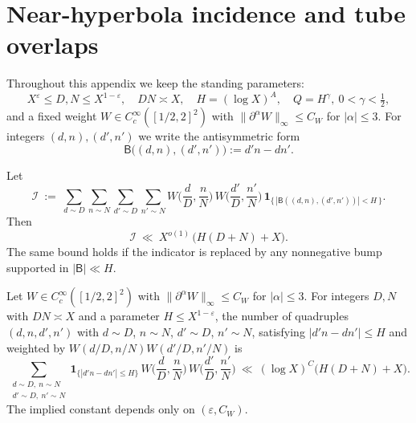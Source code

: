 
\section{Near-hyperbola incidence and tube overlaps}\label{app:incidence}

Throughout this appendix we keep the standing parameters:
\[
X^\varepsilon\le D,N\le X^{1-\varepsilon},\quad DN\asymp X,\quad
H=(\log X)^A,\quad Q=H^\gamma,\ 0<\gamma<\tfrac12,
\]
and a fixed weight $W\in C_c^\infty([1/2,2]^2)$ with $\|\partial^\alpha W\|_\infty\le C_W$ for $|\alpha|\le 3$.
For integers $(d,n),(d',n')$ we write the antisymmetric form
\[
\mathsf B\bigl((d,n),(d',n')\bigr):=d'n-dn'.
\]

\begin{proposition}\label{prop:incidence-weighted}
Let
\[
\mathcal I\ :=\ \sum_{d\sim D}\sum_{n\sim N}\sum_{d'\sim D}\sum_{n'\sim N}
W\!\Big(\frac{d}{D},\frac{n}{N}\Big)\,W\!\Big(\frac{d'}{D},\frac{n'}{N}\Big)\,
\mathbf 1_{\{\,|\mathsf B((d,n),(d',n'))|<H\,\}}.
\]
Then
\begin{equation}\label{eq:incidence}
\mathcal I\ \ll\ X^{o(1)}\,\Big(H(D+N)+X\Big).
\end{equation}
The same bound holds if the indicator is replaced by any nonnegative bump supported in $|\mathsf B|\ll H$.
\end{proposition}

\begin{proposition}\label{prop:incidence}
Let $W\in C_c^\infty([1/2,2]^2)$ with $\|\partial^\alpha W\|_\infty\le C_W$ for $|\alpha|\le 3$. For integers $D,N$ with $DN\asymp X$ and a parameter $H\le X^{1-\varepsilon}$, the number of quadruples $(d,n,d',n')$ with $d\sim D$, $n\sim N$, $d'\sim D$, $n'\sim N$, satisfying $|d'n-dn'|\le H$ and weighted by $W(d/D,n/N)W(d'/D,n'/N)$ is
\[
\sum_{\substack{d\sim D,\ n\sim N\\ d'\sim D,\ n'\sim N}}\!
\mathbf 1_{\{|d'n-dn'|\le H\}}\,
W\!\Big(\frac dD,\frac nN\Big)\,W\!\Big(\frac{d'}D,\frac{n'}N\Big)
\ \ll\ (\log X)^C\big(H(D+N)+X\big).
\]
The implied constant depends only on $(\varepsilon,C_W)$.
\end{proposition}


